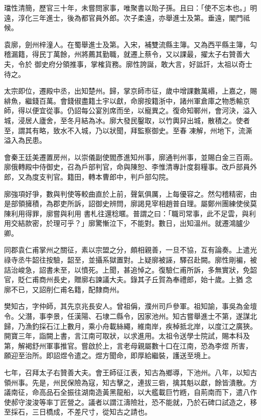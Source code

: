 \begin{pinyinscope}
 璫性清簡，歷官三十年，未嘗問家事，唯聚書以貽子孫。且曰：「使不忘本也。」明遠，淳化三年進士，後為都官員外郎。次子柔遠，亦舉進士及第。垂遠，閣門祗候。



 袁廓，劍州梓潼人。在蜀舉進士及第。入宋，補雙流縣主簿。又為西平縣主簿，勾稽漏籍，得民丁萬餘，州將薦其勤職，就遷上蔡令，又以課最，擢太子右贊善大夫，令於
 御史府分領推事，掌榷貨務。廓性誇誕，敢大言，好詆訐，太祖以奇士待之。



 太宗即位，遷殿中丞，出知楚州。歸，掌京師市征，歲中增課數萬緡，上嘉之，賜緋魚，繼錢百萬。會錢俶盡籍土宇以獻，命廓按籍浙中，諸州軍倉庫之物悉輸京師，得以便宜從事。仍詔每公宴別席而坐，以寵異之。復命知鄆州，會河決，溢入城，浸居人廬舍，至冬月結為冰。廓大發民鑿取，以竹輿舁出城，散積之。使者至，謂其有略，致水不入城，乃以狀聞，拜監察御史。至春
 凍解，州地下，流澌溢入為民患。



 會秦王廷美遷置房州，以崇儀副使閻彥進知州事，廓通判州事，並賜白金三百兩。廓俄轉殿中侍御史，召為戶部判官，命與陳恕、李惟清專計度芻糧事。改戶部員外郎，又為度支判官。籍田，轉本曹郎中，判戶部勾院。



 廓強項好爭，數與判使等較曲直於上前，聲氣俱厲，上每優容之。然勾稽精密，由是部領擁積，為郡吏所訴，詔御史辨問，廓謁見宰相趙普自理。屬鄭州團練使侯莫陳利用得罪，廓嘗與利用
 書札往還稔暱。普謂之曰：「職司常事，此不足雲，與利用交結款密，於理可乎？」廓驚慚泣下，不能對。數日，出知溫州。就遷鴻臚少卿。



 同郡袁仁甫掌州之關征，素以宗盟之分，頗相親善，一旦不協，互有論奏。上遣光祿寺丞牛韶往按驗，韶至，並攝系獄置對。上疑廓被誣，驛召赴闕。廓性剛褊，被詰治峻急，詔書未至，以憤死。上聞，甚追悼之。復驗仁甫所訴，多無實狀，免韶官，貶仁甫商州長史，贈廓右諫議大夫。錄其子丘賀為奉禮郎，始十歲。上猶
 念廓不已，又詔削仁甫名籍，配隸商州。



 樊知古，字仲師，其先京兆長安人。曾祖偁，濮州司戶參軍。祖知諭，事吳為金壇令。父潛，事李景，任漢陽、石埭二縣令，因家池州。知古嘗舉進士不第，遂謀北歸，乃漁釣採石江上數月，乘小舟載絲繩，維南岸，疾棹抵北岸，以度江之廣狹。開寶三年，詣闕上書，言江南可取狀，以求進用。太祖令送學士院試，賜本科及第，解褐舒州軍事推官。嘗啟於上，言老母親屬數十口在江南，恐為李煜
 所害，願迎至治所。即詔煜令遣之。煜方聞命，即厚給繼裝，護送至境上。



 七年，召拜太子右贊善大夫。會王師征江表，知古為鄉導，下池州。八年，以知古領州事。先是，州民保險為寇，知古擊之，連拔三砦，擒其魁以獻，餘皆潰散。方議南征，命高品石全振往湖南造黃黑龍船，以大艦載巨竹緪，自荊南而下，遣八作使郝守浚浚等率丁匠營之。議者以謂江濤險壯，恐不能就，乃於石碑口試造之，移至採石，三日橋成，不差尺寸，從知古之請也。




\end{pinyinscope}
